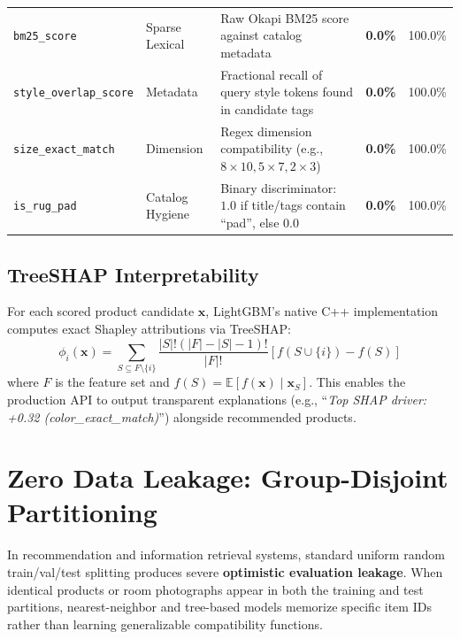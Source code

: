 \documentclass[11pt,a4paper]{article}
\begin{document}
\begin{table}[htbp]
\begin{tabularx}{\textwidth}{lp{2.8cm}Xcc}
\texttt{bm25\_score} & Sparse Lexical & Raw Okapi BM25 score against catalog metadata & \textbf{0.0\%} & 100.0\% \\
\texttt{style\_overlap\_score} & Metadata & Fractional recall of query style tokens found in candidate tags & \textbf{0.0\%} & 100.0\% \\
\texttt{size\_exact\_match} & Dimension & Regex dimension compatibility (e.g., $8\times 10, 5\times 7, 2\times 3$) & \textbf{0.0\%} & 100.0\% \\
\texttt{is\_rug\_pad} & Catalog Hygiene & Binary discriminator: $1.0$ if title/tags contain ``pad'', else $0.0$ & \textbf{0.0\%} & 100.0\% \\
\bottomrule
\end{tabularx}
\end{table}

\subsection{TreeSHAP Interpretability}
For each scored product candidate $\mathbf{x}$, LightGBM’s native C++ implementation computes exact Shapley attributions via TreeSHAP:
\begin{equation}
\phi_i(\mathbf{x}) = \sum_{S \subseteq F \setminus \{i\}} \frac{|S|! (|F| - |S| - 1)!}{|F|!} \left[ f(S \cup \{i\}) - f(S) \right]
\end{equation}
where $F$ is the feature set and $f(S) = \mathbb{E}[f(\mathbf{x}) \mid \mathbf{x}_S]$. This enables the production API to output transparent explanations (e.g., ``\textit{Top SHAP driver: +0.32 (color\_exact\_match)}'') alongside recommended products.

\section{Zero Data Leakage: Group-Disjoint Partitioning}

In recommendation and information retrieval systems, standard uniform random train/val/test splitting produces severe \textbf{optimistic evaluation leakage}. When identical products or room photographs appear in both the training and test partitions, nearest-neighbor and tree-based models memorize specific item IDs rather than learning generalizable compatibility functions.
\end{document}
